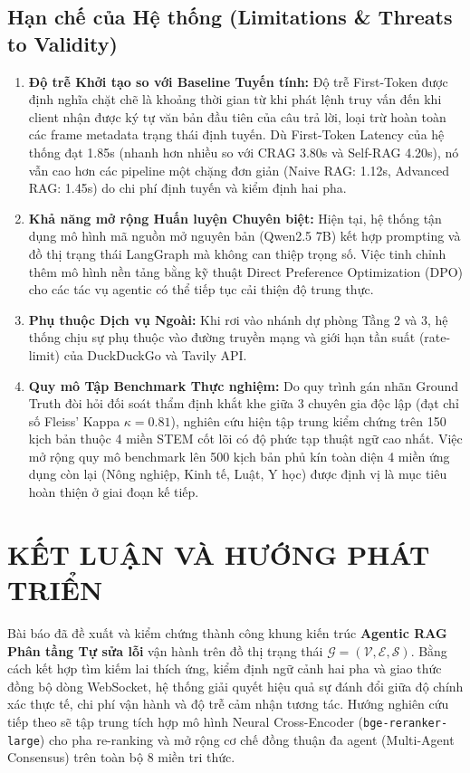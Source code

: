 \documentclass[conference]{IEEEtran}
\begin{document}
\subsection{Hạn chế của Hệ thống (Limitations \& Threats to Validity)}
\begin{enumerate}
    \item \textbf{Độ trễ Khởi tạo so với Baseline Tuyến tính:} Độ trễ First-Token được định nghĩa chặt chẽ là khoảng thời gian từ khi phát lệnh truy vấn đến khi client nhận được ký tự văn bản đầu tiên của câu trả lời, loại trừ hoàn toàn các frame metadata trạng thái định tuyến. Dù First-Token Latency của hệ thống đạt 1.85s (nhanh hơn nhiều so với CRAG 3.80s và Self-RAG 4.20s), nó vẫn cao hơn các pipeline một chặng đơn giản (Naive RAG: 1.12s, Advanced RAG: 1.45s) do chi phí định tuyến và kiểm định hai pha.
    \item \textbf{Khả năng mở rộng Huấn luyện Chuyên biệt:} Hiện tại, hệ thống tận dụng mô hình mã nguồn mở nguyên bản (Qwen2.5 7B) kết hợp prompting và đồ thị trạng thái LangGraph mà không can thiệp trọng số. Việc tinh chỉnh thêm mô hình nền tảng bằng kỹ thuật Direct Preference Optimization (DPO) cho các tác vụ agentic có thể tiếp tục cải thiện độ trung thực.
    \item \textbf{Phụ thuộc Dịch vụ Ngoài:} Khi rơi vào nhánh dự phòng Tầng 2 và 3, hệ thống chịu sự phụ thuộc vào đường truyền mạng và giới hạn tần suất (rate-limit) của DuckDuckGo và Tavily API.
    \item \textbf{Quy mô Tập Benchmark Thực nghiệm:} Do quy trình gán nhãn Ground Truth đòi hỏi đối soát thẩm định khắt khe giữa 3 chuyên gia độc lập (đạt chỉ số Fleiss' Kappa $\kappa = 0.81$), nghiên cứu hiện tập trung kiểm chứng trên 150 kịch bản thuộc 4 miền STEM cốt lõi có độ phức tạp thuật ngữ cao nhất. Việc mở rộng quy mô benchmark lên 500 kịch bản phủ kín toàn diện 4 miền ứng dụng còn lại (Nông nghiệp, Kinh tế, Luật, Y học) được định vị là mục tiêu hoàn thiện ở giai đoạn kế tiếp.
\end{enumerate}

\section{KẾT LUẬN VÀ HƯỚNG PHÁT TRIỂN}
Bài báo đã đề xuất và kiểm chứng thành công khung kiến trúc \textbf{Agentic RAG Phân tầng Tự sửa lỗi} vận hành trên đồ thị trạng thái $\mathcal{G} = (\mathcal{V}, \mathcal{E}, \mathcal{S})$. Bằng cách kết hợp tìm kiếm lai thích ứng, kiểm định ngữ cảnh hai pha và giao thức đồng bộ dòng WebSocket, hệ thống giải quyết hiệu quả sự đánh đổi giữa độ chính xác thực tế, chi phí vận hành và độ trễ cảm nhận tương tác. Hướng nghiên cứu tiếp theo sẽ tập trung tích hợp mô hình Neural Cross-Encoder (\texttt{bge-reranker-large}) cho pha re-ranking và mở rộng cơ chế đồng thuận đa agent (Multi-Agent Consensus) trên toàn bộ 8 miền tri thức.
\end{document}
